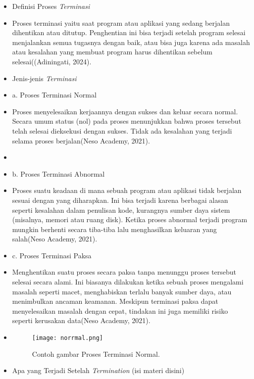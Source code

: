 \documentclass[12pt]{article}
\begin{document}
\begin{itemize}
    \item Definisi Proses \textit{Terminasi}
    \item[] 
Proses terminasi yaitu saat program atau aplikasi yang sedang berjalan dihentikan atau ditutup. Penghentian ini bisa terjadi setelah program selesai menjalankan semua tugasnya dengan baik, atau bisa juga karena ada masalah atau kesalahan yang membuat program harus dihentikan sebelum selesai((Adiningati, 2024).

    \item Jenis-jenis \textit{Terminasi}
    \item[] 
a. Proses Terminasi Normal
     \item[]
Proses menyelesaikan kerjaannya dengan sukses dan keluar secara normal. Secara umum status (nol) pada proses menunjukkan bahwa proses tersebut telah selesai dieksekusi dengan sukses. Tidak ada kesalahan yang terjadi selama proses berjalan(Neso Academy, 2021).
     \item[]
     \item[] 
b. Proses Terminasi Abnormal
     \item[]
Proses suatu keadaan di mana sebuah program atau aplikasi tidak berjalan sesuai dengan yang diharapkan. Ini bisa terjadi karena berbagai alasan seperti kesalahan dalam penulisan kode, kurangnya sumber daya sistem (misalnya, memori atau ruang disk). Ketika proses abnormal terjadi program mungkin berhenti secara tiba-tiba lalu menghasilkan keluaran yang salah(Neso Academy, 2021). 
     \item[]
c. Proses Terminasi Paksa
     \item[]
Menghentikan suatu proses secara paksa tanpa menunggu proses tersebut selesai secara alami. Ini biasanya dilakukan ketika sebuah proses mengalami masalah seperti macet, menghabiskan terlalu banyak sumber daya, atau menimbulkan ancaman keamanan. Meskipun terminasi paksa dapat menyelesaikan masalah dengan cepat, tindakan ini juga memiliki risiko seperti kerusakan data(Neso Academy, 2021).
    \item[]

\begin{figure}[h]
\centering
\texttt{[image: norrmal.png]}
\caption{Contoh gambar Proses Terminasi Normal.}
\end{figure}

    \item Apa yang Terjadi Setelah \textit{Termination}
    (isi materi disini)
\end{itemize}
\end{document}
